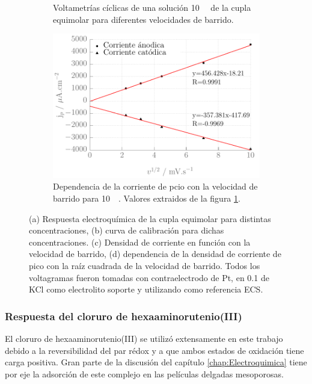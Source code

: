 {\begin{figure}[h!]
\begin{subfigure}[t]{0.495\textwidth}
        	    \caption{Voltametrías cíclicas de una solución \SI{10}{\milli\Molar} de la cupla equimolar \fe\space para diferentes velocidades de barrido.}
        	    \label{fig:Fe_c}
     		 	\end{subfigure}
     		 	\vspace*{2mm}
     	 	\begin{subfigure}[t]{0.495\textwidth}
        		\includegraphics[width=\textwidth]{Graficos/VelocidadesCal_Fe.pdf}
       			\caption[Respuesta a diferentes velocidades de barrido para \fe]{Dependencia de la corriente de pcio con la velocidad de barrido para \fe\space \SI{10}{\milli\Molar}. Valores extraidos de la figura \ref{fig:Fe_c}.}
         		\label{fig:Fe_d}
     			\end{subfigure}
     		 \caption[Respuesta electroquímica para \fe]{(a) Respuesta electroquímica de la cupla equimolar \fe\space para distintas concentraciones, (b) curva de calibración para dichas concentraciones. (c) Densidad de corriente en función con la velocidad de barrido, (d) dependencia de la densidad de corriente de pico con la raíz cuadrada de la velocidad de barrido. Todos los voltagramas fueron tomadas con contraelectrodo de Pt, en \SI{0,1}{\Molar} de KCl como electrolito soporte y utilizando como referencia ECS.}
     		 \label{fig:ferro-ferri-CV}
     		 \end{figure}
		
		\subsubsection{Respuesta del cloruro de hexaaminorutenio(III)}
	
	 	 El cloruro de hexaaminorutenio(III) se utilizó extensamente en este trabajo debido a la reversibilidad del par rédox y a que ambos estados de oxidación tiene carga positiva. Gran parte de la discusión del capítulo \ref{chap:Electroquimica} tiene por eje la adsorción de este complejo en las películas delgadas mesoporosas. 

}
